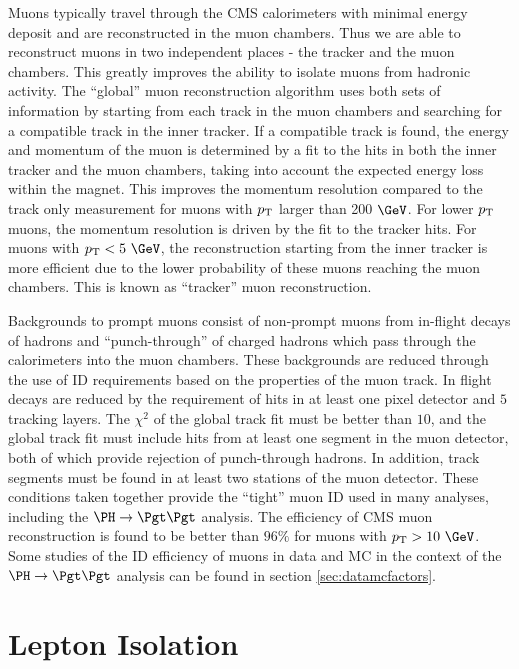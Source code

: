 Muons typically travel through the CMS calorimeters with minimal energy deposit
and are reconstructed in the muon chambers. Thus we are able to reconstruct
muons in two independent places - the tracker and the muon chambers. This
greatly improves the ability to isolate muons from hadronic activity. The
``global'' muon reconstruction algorithm \cite{MuonReco} uses both sets of information by
starting from each track in the muon chambers and searching for a compatible
track in the inner tracker. If a compatible track is found, the energy and
momentum of the muon is determined by a fit to the hits in both the inner
tracker and the muon chambers, taking into account the expected energy loss
within the magnet. This improves the momentum resolution compared to
the track only measurement for muons with $p_{\mathrm{T}}$ larger than 200 $\GeV$. For
lower $p_{\mathrm{T}}$ muons, the momentum resolution is driven by the fit to the tracker
hits. For muons with $\pt < 5~\GeV$, the reconstruction starting from the inner
tracker is more efficient due to the lower probability of these muons reaching
the muon chambers. This is known as ``tracker'' muon reconstruction.  

Backgrounds to prompt muons consist of non-prompt muons from in-flight decays of
hadrons and ``punch-through'' of charged hadrons which pass through the calorimeters
into the muon chambers. These backgrounds are reduced through the use of ID
requirements based on the properties of the muon track. In flight decays are
reduced by the requirement of hits in at least one pixel detector and $5$
tracking layers. The $\chi^{2}$ of the global track fit must be better than
$10$, and the global track fit must include hits from at least one segment in
the muon detector, both of which provide rejection of punch-through hadrons. In
addition, track segments must be found in at least two stations of the muon
detector. These conditions taken together provide the ``tight'' muon ID used in
many analyses, including the $\PH\to\Pgt\Pgt$ analysis.
The efficiency of CMS muon reconstruction is found to be better
than $96\%$ for muons with $\pt > 10~\GeV$. Some studies of the ID efficiency of
muons in data and \ac{MC} in the context of the $\PH \to \Pgt\Pgt$ analysis can
be found in section \ref{sec:datamcfactors}.

\section{Lepton Isolation}
\label{sec:leptonisolation}

